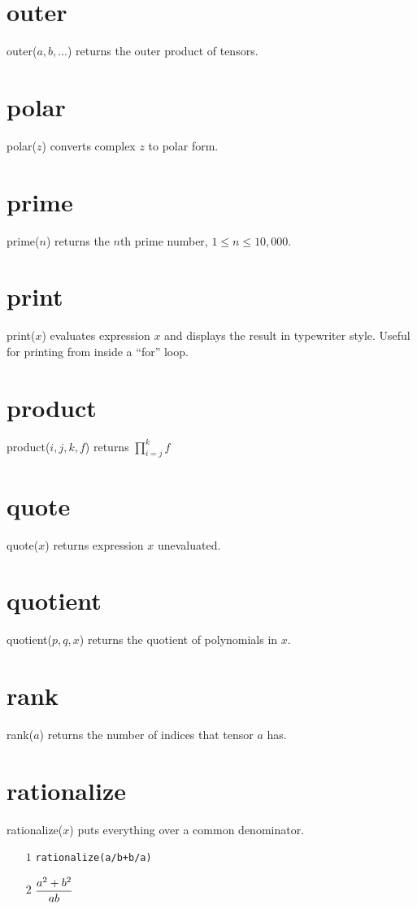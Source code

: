 \documentclass[12pt,openany]{report}
\begin{document}
\section*{outer}
outer($a,b,\ldots$) returns the outer product of tensors.

\section*{polar}
polar($z$) converts complex $z$ to polar form.

\section*{prime}
prime($n$) returns the $n$th prime number, $1\le n\le10{,}000$.

\section*{print}
print($x$) evaluates expression $x$ and displays the result in typewriter style.
Useful for printing from inside a ``for'' loop.

\section*{product}
product($i,j,k,f$) returns $\displaystyle\prod_{i=j}^k f$

\section*{quote}
quote($x$) returns expression $x$ unevaluated.

\section*{quotient}
quotient($p,q,x$) returns the quotient of polynomials in $x$.

\section*{rank}
rank($a$) returns the number of indices that tensor $a$ has.

\section*{rationalize}
rationalize($x$) puts everything over a common denominator.
\begin{itemize}
\item[$\scriptstyle1$]{\tt rationalize(a/b+b/a)}
\item[$\scriptstyle2$]\hspace{50pt} $\displaystyle{a^2+b^2\over ab}$
\end{itemize}
\end{document}
